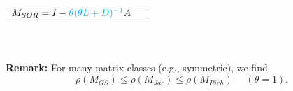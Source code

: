 \begin{frame}
{\begin{tabular}{l|l}
$M_{SOR} =I-{\color{cyan}\theta( \theta L+D )^{-1}}A$ &\\
\end{tabular}
}
~\\\footnotesize ~\\
\textbf{Remark:} For many matrix classes (e.g., symmetric), we find 
$$\rho(M_{GS})\le \rho(M_{Jac}) \le \rho(M_{Rich})~~~~~~(\theta = 1).$$
%	

\end{frame}



